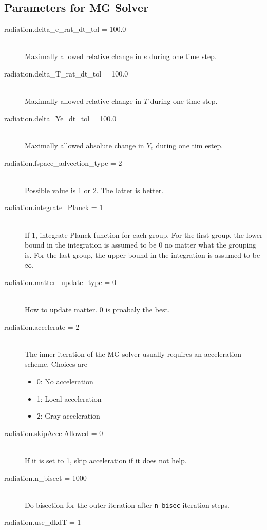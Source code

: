 \documentclass[11pt,letterpaper]{article}
\begin{document}
\subsection{Parameters for MG Solver}
\label{sec:mgpar}

\begin{description}
\item[radiation.delta\_e\_rat\_dt\_tol = 100.0] \hfill \\
  Maximally allowed relative change in $e$ during one time step.
\item[radiation.delta\_T\_rat\_dt\_tol = 100.0] \hfill \\
  Maximally allowed relative change in $T$ during one time step.
\item[radiation.delta\_Ye\_dt\_tol = 100.0] \hfill \\
  Maximally allowed absolute change in $Y_e$ during one tim estep.
\item[radiation.fspace\_advection\_type = 2] \hfill \\
  Possible value is 1 or 2.  The latter is better.
\item[radiation.integrate\_Planck = 1] \hfill \\
  If 1, integrate Planck function for each group.  For the first
  group, the lower bound in the integration is assumed to be 0 no
  matter what the grouping is.  For the last group, the upper bound in
  the integration is assumed to be $\infty$.
\item[radiation.matter\_update\_type = 0] \hfill \\
  How to update matter.  0 is proabaly the best.
\item[radiation.accelerate = 2] \hfill \\
  The inner iteration of the MG solver usually requires an
  acceleration scheme.  Choices are
  \begin{itemize}
    \item 0: No acceleration
    \item 1: Local acceleration
    \item 2: Gray acceleration
  \end{itemize}
\item[radiation.skipAccelAllowed = 0] \hfill \\
  If it is set to 1, skip acceleration if it does not help.
\item[radiation.n\_bisect = 1000] \hfill \\
  Do bisection for the outer iteration after {\tt n\_bisec} iteration steps.
\item[radiation.use\_dkdT = 1] \hfill \\

\end{description}
\end{document}
